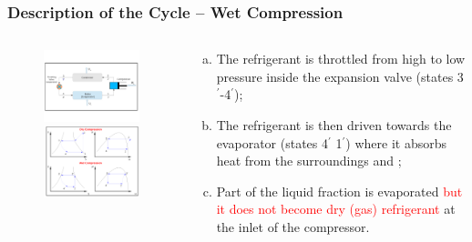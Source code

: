 \documentclass[10pt,compress]{beamer}
\begin{document}
\begin{frame}
 \frametitle{Description of the Cycle -- Wet Compression}
  \begin{columns}
   \begin{column}[c]{0.5\linewidth}
    \begin{figure}%
     \vbox{
      \includegraphics[width=5.5cm,clip]{./Pics/Overview_Refrig12}
      \vspace{-.5cm}
      \includegraphics[width=4.5cm,clip]{./Pics/Overview_Refrig13}}
    \end{figure}  
   \end{column}  
   \begin{column}[c]{0.5\linewidth}
  \begin{enumerate}[(a)]
   \item <1-> The refrigerant is throttled from high to low pressure inside the expansion valve (states 3$^{\prime}$-4$^{\prime}$);
   \item <2-> The refrigerant is then driven towards the evaporator (states 4$^{\prime}$ 1$^{\prime}$) where it absorbs heat from the surroundings and ;
   \item <3-> Part of the liquid fraction is evaporated \textcolor{red}{but it does not become dry (gas) refrigerant} at the inlet of the compressor.
  \end{enumerate}
 \end{column}  
\end{columns}
\end{frame}
\end{document}
